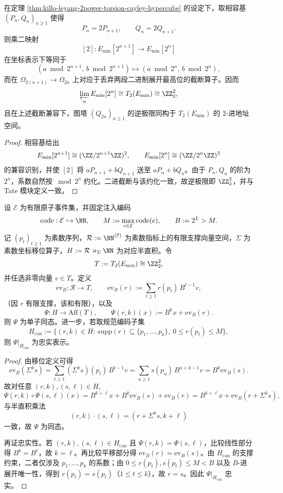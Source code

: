 \begin{corollary}\label{cor:killo-2adic-tate-hypercube-limit}
在定理 \ref{thm:killo-leyang-2power-torsion-cayley-hypercube} 的设定下，取相容基 \((P_n,Q_n)_{n\ge 1}\) 使得
\[
P_n=2P_{n+1},\qquad Q_n=2Q_{n+1}.
\]
则乘二映射
\[
[2]:E_{\min}[2^{n+1}]\longrightarrow E_{\min}[2^n]
\]
在坐标表示下等同于
\[
(a\bmod 2^{n+1},\,b\bmod 2^{n+1})\longmapsto (a\bmod 2^n,\,b\bmod 2^n),
\]
而在 \(\Omega_{2(n+1)}\to\Omega_{2n}\) 上对应于丢弃两段二进制展开最高位的截断算子。因而
\[
\varprojlim_n E_{\min}[2^n]\cong T_2(E_{\min})\cong\ZZ_2^2,
\]
且在上述截断兼容下，图塔 \((Q_{2n})_{n\ge 1}\) 的逆极限同构于 \(T_2(E_{\min})\) 的 \(2\)-进地址空间。
\end{corollary}
\begin{proof}
相容基给出
\[
E_{\min}[2^{n+1}]\cong(\ZZ/2^{n+1}\ZZ)^2,\qquad
E_{\min}[2^n]\cong(\ZZ/2^n\ZZ)^2
\]
的兼容识别，并使 \([2]\) 将 \(aP_{n+1}+bQ_{n+1}\) 送至 \(aP_n+bQ_n\)。由于 \(P_n,Q_n\) 的阶为 \(2^n\)，系数自然按 \(\bmod 2^n\) 约化。二进截断与该约化一致，故逆极限即 \(\ZZ_2^2\)，并与 Tate 模块定义一致。
\end{proof}

\begin{theorem}\label{thm:killo-godel-semidir-affine-2adic}
设 \(\mathcal E\) 为有限原子事件集，并固定注入编码
\[
\mathrm{code}:\mathcal E\hookrightarrow\NN,\qquad
M:=\max_{e\in\mathcal E}\mathrm{code}(e),\qquad B:=2^L>M.
\]
记 \((p_t)_{t\ge 1}\) 为素数序列，\(\mathcal R:=\NN^{(\mathbb P)}\) 为素数指标上的有限支撑向量空间，\(\Sigma\) 为素数坐标移位算子，\(H:=\mathcal R\rtimes_{\Sigma}\NN\) 为对应半直积。令
\[
T:=T_2(E_{\min})\cong\ZZ_2^2,
\]
并任选非零向量 \(v\in T\)。定义
\[
\mathrm{ev}_B:\mathcal R\to T,\qquad
\mathrm{ev}_B(r):=\sum_{t\ge 1} r(p_t)\,B^{t-1}v,
\]
（因 \(r\) 有限支撑，该和有限），以及
\[
\Psi:H\to\mathrm{Aff}(T),\qquad
\Psi(r,k)(x):=B^k x+\mathrm{ev}_B(r).
\]
则 \(\Psi\) 为单子同态。进一步，若取规范编码子集
\[
H_{\mathrm{can}}
:=\{(r,k)\in H:\ \mathrm{supp}(r)\subseteq\{p_1,\dots,p_k\},\ 0\le r(p_t)\le M\},
\]
则 \(\Psi|_{H_{\mathrm{can}}}\) 为忠实表示。
\end{theorem}
\begin{proof}
由移位定义可得
\[
\mathrm{ev}_B(\Sigma^k s)
=\sum_{t\ge 1}(\Sigma^k s)(p_t)\,B^{t-1}v
=\sum_{u\ge 1}s(p_u)\,B^{u+k-1}v
=B^k\mathrm{ev}_B(s).
\]
故对任意 \((r,k),(s,\ell)\in H\),
\[
\Psi(r,k)\!\circ\!\Psi(s,\ell)(x)
=B^{k+\ell}x+B^k\mathrm{ev}_B(s)+\mathrm{ev}_B(r)
=B^{k+\ell}x+\mathrm{ev}_B(r+\Sigma^k s),
\]
与半直积乘法
\[
(r,k)\cdot(s,\ell)=(r+\Sigma^k s,k+\ell)
\]
一致，故 \(\Psi\) 为同态。

再证忠实性。若 \((r,k),(s,\ell)\in H_{\mathrm{can}}\) 且 \(\Psi(r,k)=\Psi(s,\ell)\)，比较线性部分得 \(B^k=B^\ell\)，故 \(k=\ell\)。再比较平移部分得 \(\mathrm{ev}_B(r)=\mathrm{ev}_B(s)\)。由 \(H_{\mathrm{can}}\) 的支撑约束，二者仅涉及 \(p_1,\dots,p_k\) 的系数；由 \(0\le r(p_t),s(p_t)\le M<B\) 以及 \(B\)-进展开唯一性，得到 \(r(p_t)=s(p_t)\)（\(1\le t\le k\)），故 \(r=s\)。因此 \(\Psi|_{H_{\mathrm{can}}}\) 忠实。
\end{proof}

